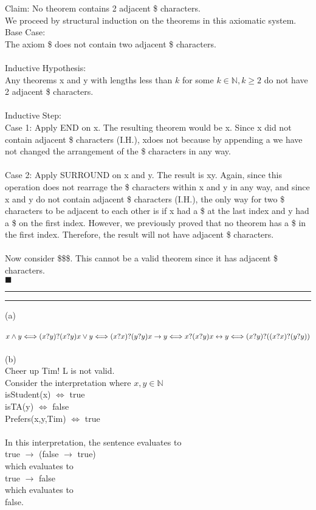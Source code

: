 \documentclass[11pt,letterpaper]{article}
\newcommand{\question}[2] {\vspace{.25in} \hrule\vspace{0.5em}
\noindent{\bf #1: #2} \vspace{0.5em}
\hrule \vspace{.10in}}
\begin{document}
Claim: No theorem contains 2 adjacent \$ characters.\\
We proceed by structural induction on the theorems in this axiomatic system.
\\
Base Case:\\
The axiom \textbar \$ does not contain two adjacent \$ characters.\\
\\
Inductive Hypothesis:\\
Any theorems x and y with lengths less than $k$ for some $k \in \mathbb{N}, k\geq 2$ do not have 2 adjacent \$ characters.\\
\\
Inductive Step:\\
Case 1: Apply END on x. The resulting theorem would be x\textbar. Since x did not contain adjacent \$ characters (I.H.), x\textbar does not because by appending a \textbar we have not changed the arrangement of the \$ characters in any way.\\
\\
Case 2: Apply SURROUND on x and y. The result is \textbar xy\textbar. Again, since this operation does not rearrage the \$ characters within x and y in any way, and since x and y do not contain adjacent \$ characters (I.H.), the only way for two \$ characters to be adjacent to each other is if x had a \$ at the last index and y had a \$ on the first index. However, we previously proved that no theorem has a \$ in the first index. Therefore, the result will not have adjacent \$ characters.\\
\\
Now consider \textbar\textbar\$\textbar\textbar\textbar\$\$\textbar. This cannot be a valid theorem since it has adjacent \$ characters.\\
$\blacksquare$

\question{2}{Teaching Assistant Assitance}
(a)\\
\\
\( x \wedge y \Longleftrightarrow (x?y)?(x?y)\\
x \vee y \Longleftrightarrow (x?x)?(y?y)\\
x \rightarrow y \Longleftrightarrow x?(x?y)\\
x \leftrightarrow y \Longleftrightarrow (x?y)?((x?x)?(y?y)) \)\\
\\
(b)\\
Cheer up Tim! L is not valid.\\
Consider the interpretation where $x,y \in \mathbb{N}$\\
isStudent(x) $\Leftrightarrow$ true\\
isTA(y) $\Leftrightarrow$ false\\
Prefers(x,y,Tim) $\Leftrightarrow$ true\\
\\
In this interpretation, the sentence evaluates to\\
true $\rightarrow$ (false $\rightarrow$ true)\\
which evaluates to\\
true $\rightarrow$ false\\
which evaluates to\\
false.\\
\end{document}
